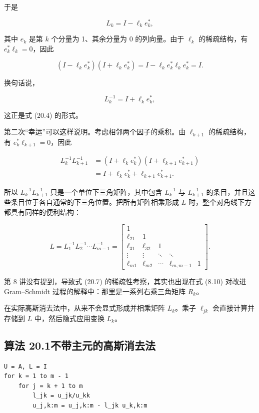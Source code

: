 \documentclass[UTF8,fontset=none,12pt]{ctexart}
\theoremstyle{definition}
\begin{document}
于是

$$
L_k=I-\ell_ke_k^*,
$$

其中 $e_k$ 是第 $k$ 个分量为 1、其余分量为 0 的列向量。由于 $\ell_k$ 的稀疏结构，有 $e_k^*\ell_k=0$，因此

$$
(I-\ell_ke_k^*)(I+\ell_ke_k^*)
=I-\ell_ke_k^*\ell_ke_k^*
=I.
$$

换句话说，

$$
L_k^{-1}=I+\ell_ke_k^*,
$$

这正是式 (20.4) 的形式。

第二次“幸运”可以这样说明。考虑相邻两个因子的乘积。由 $\ell_{k+1}$ 的稀疏结构，有 $e_k^*\ell_{k+1}=0$，因此

\begin{equation*}
\begin{aligned}
L_k^{-1}L_{k+1}^{-1}
&=(I+\ell_ke_k^*)(I+\ell_{k+1}e_{k+1}^*)\\
&=I+\ell_ke_k^*+\ell_{k+1}e_{k+1}^*.
\end{aligned}
\end{equation*}

所以 $L_k^{-1}L_{k+1}^{-1}$ 只是一个单位下三角矩阵，其中包含 $L_k^{-1}$ 与 $L_{k+1}^{-1}$ 的条目，并且这些条目位于各自通常的下三角位置。把所有矩阵相乘形成 $L$ 时，整个对角线下方都具有同样的便利结构：

\begin{equation}
L=L_1^{-1}L_2^{-1}\cdots L_{m-1}^{-1}
=
\begin{bmatrix}
1&&&\\
\ell_{21}&1&&\\
\ell_{31}&\ell_{32}&1&\\
\vdots&\vdots&\ddots&\ddots\\
\ell_{m1}&\ell_{m2}&\cdots&\ell_{m,m-1}&1
\end{bmatrix}.
\tag{20.7}
\end{equation}

第 8 讲没有提到，导致式 (20.7) 的稀疏性考察，其实也出现在式 (8.10) 对改进 Gram–Schmidt 过程的解释中：那里是一系列右乘三角矩阵 $R_k$。

在实际高斯消去法中，从来不会显式形成并相乘矩阵 $L_k$。乘子 $\ell_{jk}$ 会直接计算并存储到 $L$ 中，然后隐式应用变换 $L_k$。

\subsection*{算法 20.1\quad 不带主元的高斯消去法}

\begin{verbatim}
U = A, L = I
for k = 1 to m - 1
    for j = k + 1 to m
        l_jk = u_jk/u_kk
        u_j,k:m = u_j,k:m - l_jk u_k,k:m
\end{verbatim}
\end{document}
